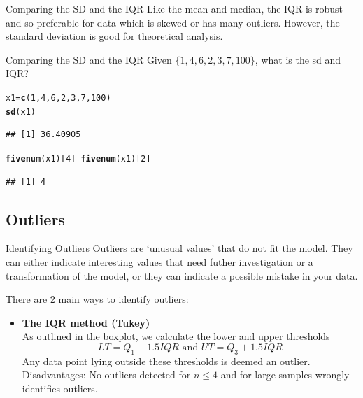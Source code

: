 \documentclass[t,xcolor=pdftex,dvipsnames,table]{beamer}\usepackage[]{graphicx}\usepackage[]{color}
\makeatletter
\newcommand{\hlnum}[1]{\textcolor[rgb]{0.686,0.059,0.569}{#1}}%
\newcommand{\hlopt}[1]{\textcolor[rgb]{0,0,0}{#1}}%
\newcommand{\hlstd}[1]{\textcolor[rgb]{0.345,0.345,0.345}{#1}}%
\newcommand{\hlkwb}[1]{\textcolor[rgb]{0.69,0.353,0.396}{#1}}%
\newcommand{\hlkwd}[1]{\textcolor[rgb]{0.737,0.353,0.396}{\textbf{#1}}}%
\newenvironment{kframe}{%
 \def\at@end@of@kframe{}%
 \ifinner\ifhmode%
  \def\at@end@of@kframe{\end{minipage}}%
  \begin{minipage}{\columnwidth}%
 \fi\fi%
 \def\FrameCommand##1{\hskip\@totalleftmargin \hskip-\fboxsep
 \colorbox{shadecolor}{##1}\hskip-\fboxsep
     \hskip-\linewidth \hskip-\@totalleftmargin \hskip\columnwidth}%
 \MakeFramed {\advance\hsize-\width
   \@totalleftmargin\z@ \linewidth\hsize
   \@setminipage}}%
 {\par\unskip\endMakeFramed%
 \at@end@of@kframe}
\newenvironment{knitrout}{}{} %
\makeatother
\begin{document}
\begin{frame}[fragile]{Comparing the SD and the IQR}
Like the mean and median, the IQR is robust and so preferable for data which is skewed or has many outliers. However, the standard deviation is good for theoretical analysis.

\vspace{.5cm}
\begin{block}{Comparing the SD and the IQR}
Given $\{ 1,4,6,2,3,7,100\}$, what is the sd and IQR?
\end{block}

\begin{knitrout}
\color{fgcolor}\begin{kframe}
\begin{alltt}
\hlstd{x1}\hlkwb{=}\hlkwd{c}\hlstd{(}\hlnum{1}\hlstd{,}\hlnum{4}\hlstd{,}\hlnum{6}\hlstd{,}\hlnum{2}\hlstd{,}\hlnum{3}\hlstd{,}\hlnum{7}\hlstd{,}\hlnum{100}\hlstd{)}
\hlkwd{sd}\hlstd{(x1)}
\end{alltt}
\begin{verbatim}
## [1] 36.40905
\end{verbatim}
\begin{alltt}
\hlkwd{fivenum}\hlstd{(x1)[}\hlnum{4}\hlstd{]} \hlopt{-} \hlkwd{fivenum}\hlstd{(x1)[}\hlnum{2}\hlstd{]}
\end{alltt}
\begin{verbatim}
## [1] 4
\end{verbatim}
\end{kframe}
\end{knitrout}
\end{frame}

\subsection[]{Outliers}
\begin{frame}[fragile]{Identifying Outliers}
Outliers are `unusual values' that do not fit the model. They can either indicate interesting values that need futher investigation or a transformation of the model, or they can indicate a possible mistake in your data.

\vspace{.5cm}
There are 2 main ways to identify outliers:
\begin{itemize}
\item {\bf The IQR method (Tukey)} \\
As outlined in the boxplot, we calculate the lower and upper thresholds
\[ LT = Q_{1} - 1.5 IQR  \mbox{  and   }  UT = Q_{3} + 1.5 IQR  \]
Any data point lying outside these thresholds is deemed an outlier. \\
Disadvantages:  No outliers detected for $n \leq 4$ and for large samples wrongly identifies outliers.
\end{itemize}
\end{frame}
\end{document}
